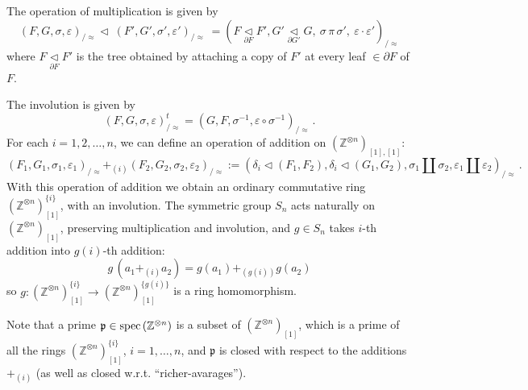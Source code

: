 \documentclass[leqno]{article}
\numberwithin{equation}{section}
\begin{document}
\smallskip

The operation of multiplication is given by
\begin{equation}
\label{eq1019}
(F,G,\sigma,\varepsilon)_{/ \approx} \lhd \ (F',G',\sigma' , \varepsilon')_{/ \approx} \ = \left(F \underset{\partial F}{\lhd} F', G' \underset{\partial G'}{\lhd} G , \ \sigma \, \pi \, \sigma' , \ \varepsilon \cdot \varepsilon'\right)_{\!\!/ \approx}
\end{equation}
where $F \underset{\partial F}{\lhd} F'$ is the tree obtained by attaching a copy of $F'$ at every leaf $\in \partial F$ of $F$.

\smallskip

The involution is given by
\begin{equation}
\label{eq1020}
(F,G,\sigma,\varepsilon)_{/\approx}^t = (G,F,\sigma^{-1} , \varepsilon \circ \sigma^{-1})_{/\approx} \, .
\end{equation}
For each $i=1,2,\ldots ,n$, we can define an operation of addition on $({\mathbb Z}^{\otimes n})_{[1],[1]}$:
\begin{equation}
\label{eq1021}
(F_1 ,G_1 ,\sigma_1 , \varepsilon_1)_{/\approx} +_{(i)} (F_2 ,G_2 ,\sigma_2 , \varepsilon_2)_{/\approx} := (\delta_i \lhd (F_1,F_2) , \delta_i \lhd (G_1 , G_2) , \sigma_1 \amalg \sigma_2 , \varepsilon_1 \amalg \varepsilon_2)_{/\approx}  \, .
\end{equation}
With this operation of addition we obtain an ordinary commutative ring $({\mathbb Z}^{\otimes n})_{[1]}^{\{ i \}}$, with an involution. The symmetric group $S_n$ acts naturally on $({\mathbb Z}^{\otimes n})_{[1]}$, preserving multiplication and involution, and $g \in S_n$ takes $i$-th addition into $g(i)$-th addition:
\begin{equation}
\label{eq1022}
g \, (a_1 +_{(i)} a_2) = g(a_1) +_{(g(i))} g(a_2)
\end{equation}
so $g : ({\mathbb Z}^{\otimes n})_{[1]}^{\{ i \}} \to ({\mathbb Z}^{\otimes n})_{[1]}^{\{ g(i)\}}$ is a ring homomorphism.

\smallskip

Note that a prime ${\mathfrak p} \in {\rm spec} \, ({\mathbb Z}^{\otimes n})$ is a subset of $({\mathbb Z}^{\otimes n})_{[1]}$, which is a prime of all the rings $({\mathbb Z}^{\otimes n})_{[1]}^{\{i\}}$, $i =1,\ldots ,n$, and ${\mathfrak p}$ is closed with respect to the additions $+_{(i)}$ (as well as closed w.r.t. ``richer-avarages'').

\bigskip
\end{document}
